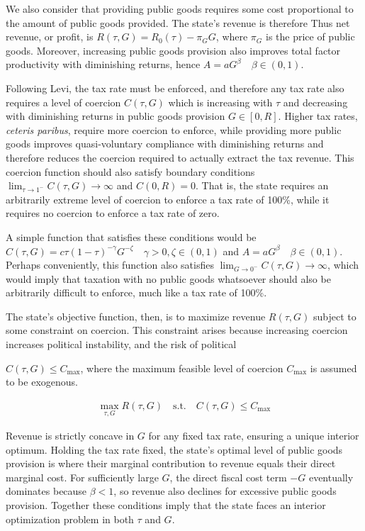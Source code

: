 \documentclass[bibtex,nonblind]{apsr_submission}
\begin{document}
We also consider that providing public goods requires some cost proportional to the amount of public goods provided. The state's revenue is therefore Thus net revenue, or profit, is $R(\tau, G) = R_0(\tau)-\pi_G G$, where $\pi_G$ is the price of public goods. Moreover, increasing public goods provision also improves total factor productivity with diminishing returns, hence $A = aG^\beta \quad \beta \in (0,1)$.

Following Levi\cite{levi1988}, the tax rate must be enforced, and therefore any tax rate also requires a level of coercion $C(\tau, G)$ which is increasing with $\tau$ and decreasing with diminishing returns in public goods provision $G \in [0, R]$. Higher tax rates, \textit{ceteris paribus}, require more coercion to enforce, while providing more public goods improves quasi-voluntary compliance with diminishing returns and therefore reduces the coercion required to actually extract the tax revenue. This coercion function should also satisfy boundary conditions $\lim_{\tau \rightarrow 1^-} C(\tau,G) \rightarrow \infty$ and $C(0,R) = 0$. That is, the state requires an arbitrarily extreme level of coercion to enforce a tax rate of 100\%, while it requires no coercion to enforce a tax rate of zero. 

A simple function that satisfies these conditions would be $C(\tau, G)=c \tau(1-\tau)^{-\gamma} G^{-\zeta} \quad \gamma > 0, \zeta \in (0,1)$ and $A=aG^\beta \quad \beta \in (0,1)$. Perhaps conveniently, this function also satisfies $\lim_{G \rightarrow 0^-} C(\tau, G) \rightarrow \infty$, which would imply that taxation with no public goods whatsoever should also be arbitrarily difficult to enforce, much like a tax rate of 100\%.

The state's objective function, then, is to maximize revenue $R(\tau, G)$ subject to some constraint on coercion. This constraint arises because increasing coercion increases political instability, and the risk of political


$C(\tau, G) \leq C_{\text{max}}$, where the maximum feasible level of coercion $C_{\text{max}}$ is assumed to be exogenous.

\begin{align*} \label{model1}
\max_{\tau, G} R(\tau, G) \quad \text{s.t.} \quad C(\tau, G) \leq C_{\text{max}}
\end{align*}

Revenue is strictly concave in $G$ for any fixed tax rate, ensuring a unique interior optimum. Holding the tax rate fixed, the state's optimal level of public goods provision is where their marginal contribution to revenue equals their direct marginal cost. For sufficiently large $G$, the direct fiscal cost term $-G$ eventually dominates because $\beta<1$, so revenue also declines for excessive public goods provision. Together these conditions imply that the state faces an interior optimization problem in both $\tau$ and $G$.
\end{document}
